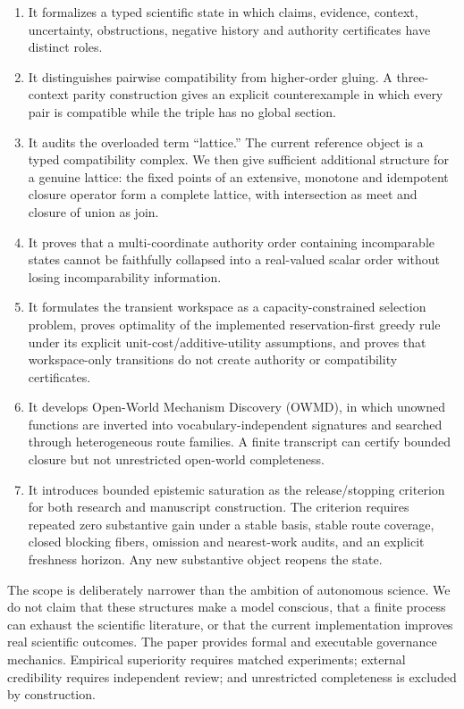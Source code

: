 \documentclass[11pt]{article}
\begin{document}
\begin{enumerate}[leftmargin=*]
\item It formalizes a typed scientific state in which claims, evidence, context, uncertainty, obstructions, negative history and authority certificates have distinct roles.
\item It distinguishes pairwise compatibility from higher-order gluing. A three-context parity construction gives an explicit counterexample in which every pair is compatible while the triple has no global section.
\item It audits the overloaded term ``lattice.'' The current reference object is a typed compatibility complex. We then give sufficient additional structure for a genuine lattice: the fixed points of an extensive, monotone and idempotent closure operator form a complete lattice, with intersection as meet and closure of union as join.
\item It proves that a multi-coordinate authority order containing incomparable states cannot be faithfully collapsed into a real-valued scalar order without losing incomparability information.
\item It formulates the transient workspace as a capacity-constrained selection problem, proves optimality of the implemented reservation-first greedy rule under its explicit unit-cost/additive-utility assumptions, and proves that workspace-only transitions do not create authority or compatibility certificates.
\item It develops Open-World Mechanism Discovery (OWMD), in which unowned functions are inverted into vocabulary-independent signatures and searched through heterogeneous route families. A finite transcript can certify bounded closure but not unrestricted open-world completeness.
\item It introduces bounded epistemic saturation as the release/stopping criterion for both research and manuscript construction. The criterion requires repeated zero substantive gain under a stable basis, stable route coverage, closed blocking fibers, omission and nearest-work audits, and an explicit freshness horizon. Any new substantive object reopens the state.
\end{enumerate}

The scope is deliberately narrower than the ambition of autonomous science. We do not claim that these structures make a model conscious, that a finite process can exhaust the scientific literature, or that the current implementation improves real scientific outcomes. The paper provides formal and executable governance mechanics. Empirical superiority requires matched experiments; external credibility requires independent review; and unrestricted completeness is excluded by construction.
\end{document}
